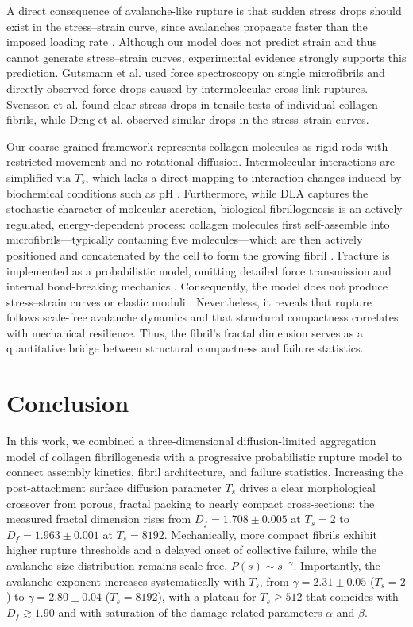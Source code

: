 \documentclass[aps,physrev,preprint,groupedaddress,linenumbers]{revtex4-2}
\begin{document}
A direct consequence of avalanche-like rupture is that sudden stress drops should exist in the stress--strain curve, since avalanches propagate faster than the imposed loading rate \cite{Noguchi2024}. Although our model does not predict strain and thus cannot generate stress--strain curves, experimental evidence strongly supports this prediction. Gutsmann et al. \cite{Gutsmann2004} used force spectroscopy on single microfibrils and directly observed force drops caused by intermolecular cross-link ruptures. Svensson et al. \cite{Svensson2013} found clear stress drops in tensile tests of individual collagen fibrils, while Deng et al. \cite{Deng2024} observed similar drops in the stress--strain curves.

Our coarse-grained framework represents collagen molecules as rigid rods with restricted movement and no rotational diffusion. Intermolecular interactions are simplified via $T_s$, which lacks a direct mapping to interaction changes induced by biochemical conditions such as pH \cite{Jiang2004}. Furthermore, while DLA captures the stochastic character of molecular accretion, biological fibrillogenesis is an actively regulated, energy-dependent process: collagen molecules first self-assemble into microfibrils---typically containing five molecules---which are then actively positioned and concatenated by the cell to form the growing fibril \cite{Kadler1996}. Fracture is implemented as a probabilistic model, omitting detailed force transmission and internal bond-breaking mechanics \cite{RuizFranco2022,Provenzano2006}. Consequently, the model does not produce stress--strain curves or elastic moduli \cite{Innocenti2022-lp}. Nevertheless, it reveals that rupture follows scale-free avalanche dynamics and that structural compactness correlates with mechanical resilience. Thus, the fibril's fractal dimension serves as a quantitative bridge between structural compactness and failure statistics.

\section{Conclusion}

In this work, we combined a three-dimensional diffusion-limited aggregation model of collagen fibrillogenesis with a progressive probabilistic rupture model to connect assembly kinetics, fibril architecture, and failure statistics. Increasing the post-attachment surface diffusion parameter $T_s$ drives a clear morphological crossover from porous, fractal packing to nearly compact cross-sections: the measured fractal dimension rises from $D_f=1.708\pm0.005$ at $T_s=2$ to $D_f=1.963\pm0.001$ at $T_s=8192$. Mechanically, more compact fibrils exhibit higher rupture thresholds and a delayed onset of collective failure, while the avalanche size distribution remains scale-free, $P(s)\sim s^{-\gamma}$. Importantly, the avalanche exponent increases systematically with $T_s$, from $\gamma=2.31\pm0.05$ ($T_s=2$) to $\gamma=2.80\pm0.04$ ($T_s=8192$), with a plateau for $T_s\ge 512$ that coincides with $D_f\gtrsim 1.90$ and with saturation of the damage-related parameters $\alpha$ and $\beta$.
\end{document}
